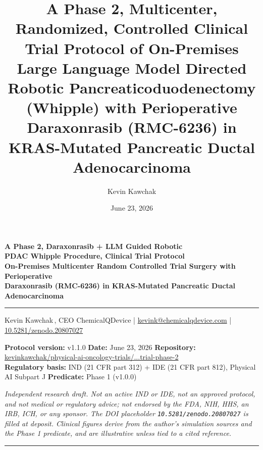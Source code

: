 \documentclass[11pt]{article}
\title{A Phase 2, Multicenter, Randomized, Controlled Clinical Trial Protocol of
On-Premises Large Language Model Directed Robotic Pancreaticoduodenectomy
(Whipple) with Perioperative Daraxonrasib (RMC-6236) in KRAS-Mutated Pancreatic
Ductal Adenocarcinoma}
\author{Kevin Kawchak}
\date{June 23, 2026}
\begin{document}
\thispagestyle{plain}

\begin{center}
{\LARGE\bfseries\color{accentcol} A Phase 2, Daraxonrasib + LLM Guided Robotic\\PDAC Whipple Procedure, Clinical Trial Protocol}\\[0.4em]
{\large\bfseries On-Premises Multicenter Random Controlled Trial Surgery with Perioperative\\Daraxonrasib (RMC-6236) in KRAS-Mutated Pancreatic
Ductal Adenocarcinoma}\\[0.3em]
{\color{accentcol}\rule{\linewidth}{1.2pt}}
\end{center}

\begin{center}\small
Kevin Kawchak\,, CEO ChemicalQDevice \;|\;
\href{mailto:kevink@chemicalqdevice.com}{kevink@chemicalqdevice.com} \;|\;
\href{https://doi.org/10.5281/zenodo.20807027}{10.5281/zenodo.20807027}
\end{center}

\begin{center}\footnotesize
\textbf{Protocol version:} v1.1.0 \quad
\textbf{Date:} June 23, 2026 \quad \textbf{Repository:} \href{https://github.com/kevinkawchak/physical-ai-oncology-trials/tree/main/trial-phase-2}{kevinkawchak/physical-ai-oncology-trials/...trial-phase-2} \\
\textbf{Regulatory basis:} IND (21 CFR part 312) + IDE (21 CFR part 812),
Physical AI Subpart J \quad \textbf{Predicate:} Phase 1 (v1.0.0)
\end{center}

\noindent\footnotesize\textit{Independent research draft. Not an active IND or
IDE, not an approved protocol, and not medical or regulatory advice; not endorsed
by the FDA, NIH, HHS, an IRB, ICH, or any sponsor. The DOI placeholder
\texttt{10.5281/zenodo.20807027} is filled at deposit. Clinical figures derive
from the author's simulation sources and the Phase 1 predicate, and are
illustrative unless tied to a cited reference.}\normalsize\par

\renewcommand{\keywordname}{\textbf{Keywords}}

\vspace{0.4em}
{\color{accentcol}\rule{\linewidth}{0.6pt}}
\end{document}
